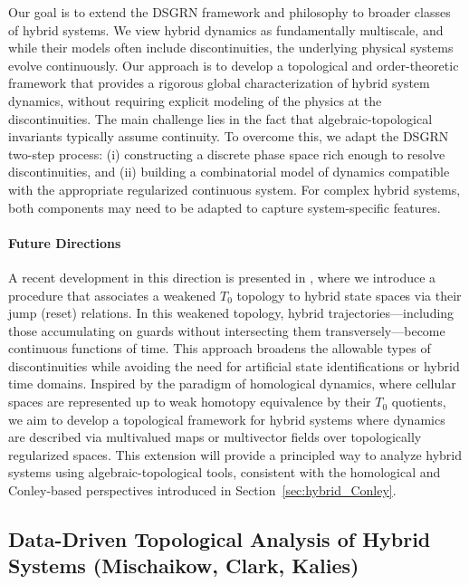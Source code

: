 \documentclass[letterpaper,11pt]{article}
\begin{document}
Our goal is to extend the DSGRN framework and philosophy to broader classes of hybrid systems.
We view hybrid dynamics as fundamentally multiscale, and while their models often include discontinuities, the underlying physical systems evolve continuously.
Our approach is to develop a topological and order-theoretic framework that provides a rigorous global characterization of hybrid system dynamics, without requiring explicit modeling of the physics at the discontinuities.
The main challenge lies in the fact that algebraic-topological invariants typically assume continuity.
To overcome this, we adapt the DSGRN two-step process:
(i) constructing a discrete phase space rich enough to resolve discontinuities, and
(ii) building a combinatorial model of dynamics compatible with the appropriate regularized continuous system.
For complex hybrid systems, both components may need to be adapted to capture system-specific features.

\paragraph{Future Directions}

A recent development in this direction is presented in \cite{ClGu-weakened_topologies}, where we introduce a procedure that associates a weakened $T_0$ topology to hybrid state spaces via their jump (reset) relations.
In this weakened topology, hybrid trajectories—including those accumulating on guards without intersecting them transversely—become continuous functions of time.
This approach broadens the allowable types of discontinuities while avoiding the need for artificial state identifications or hybrid time domains.
Inspired by the paradigm of homological dynamics, where cellular spaces are represented up to weak homotopy equivalence by their $T_0$ quotients, we aim to develop a topological framework for hybrid systems where dynamics are described via multivalued maps or multivector fields over topologically regularized spaces.
This extension will provide a principled way to analyze hybrid systems using algebraic-topological tools, consistent with the homological and Conley-based perspectives introduced in Section~\ref{sec:hybrid_Conley}.


\subsection{Data-Driven Topological Analysis of Hybrid Systems (Mischaikow, Clark, Kalies)}\label{sec:learning_Mischaikow}
\end{document}
